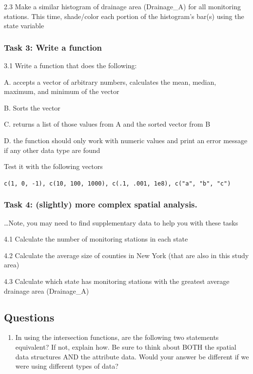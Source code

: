 \documentclass[]{article}
\providecommand{\tightlist}{%
  \setlength{\itemsep}{0pt}\setlength{\parskip}{0pt}}
\begin{document}
2.3 Make a similar histogram of drainage area (Drainage\_A) for all
monitoring stations. This time, shade/color each portion of the
histogram's bar(s) using the state variable

\hypertarget{task-3-write-a-function}{%
\subsubsection{Task 3: Write a function}\label{task-3-write-a-function}}

3.1 Write a function that does the following:

A. accepts a vector of arbitrary numbers, calculates the mean, median,
maximum, and minimum of the vector

B. Sorts the vector

C. returns a list of those values from A and the sorted vector from B

D. the function should only work with numeric values and print an error
message if any other data type are found

Test it with the following vectors

\texttt{c(1,\ 0,\ -1),\ c(10,\ 100,\ 1000),\ c(.1,\ .001,\ 1e8),\ c("a",\ "b",\ "c")}

\hypertarget{task-4-slightly-more-complex-spatial-analysis.}{%
\subsubsection{Task 4: (slightly) more complex spatial
analysis.}\label{task-4-slightly-more-complex-spatial-analysis.}}

\ldots Note, you may need to find supplementary data to help you with
these tasks

4.1 Calculate the number of monitoring stations in each state

4.2 Calculate the average size of counties in New York (that are also in
this study area)

4.3 Calculate which state has monitoring stations with the greatest
average drainage area (Drainage\_A)

\hypertarget{questions}{%
\subsection{Questions}\label{questions}}

\begin{enumerate}
\def\labelenumi{\arabic{enumi}.}
\tightlist
\item
  In using the intersection functions, are the following two statements
  equivalent? If not, explain how. Be sure to think about BOTH the
  spatial data structures AND the attribute data. Would your answer be
  different if we were using different types of data?
\end{enumerate}
\end{document}
